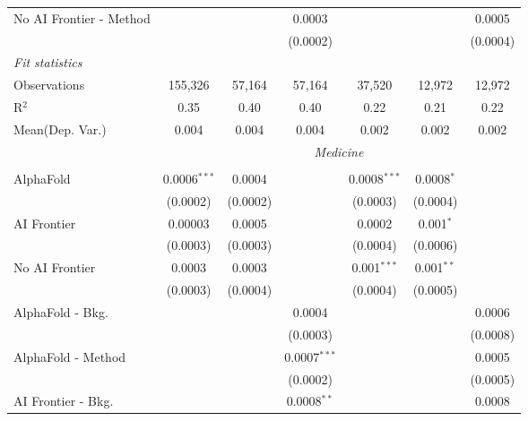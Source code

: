 \begin{tabular}{lcccccc}
   No AI Frontier - Method &                &               & 0.0003         &               &          & 0.0005\\   
                           &                &               & (0.0002)       &               &          & (0.0004)\\   
   \midrule
   \emph{Fit statistics}\\
   Observations            & 155,326        & 57,164        & 57,164         & 37,520        & 12,972   & 12,972\\  
   R$^2$                   & 0.35           & 0.40          & 0.40           & 0.22          & 0.21     & 0.22\\  
   
Mean(Dep. Var.) & 0.004 & 0.004 & 0.004 & 0.002 & 0.002 & 0.002 \\
 & \multicolumn{6}{c}{\textit{Medicine}} \\ \\
   AlphaFold               & 0.0006$^{***}$ & 0.0004   &                & 0.0008$^{***}$ & 0.0008$^{*}$ &   \\   
                           & (0.0002)       & (0.0002) &                & (0.0003)       & (0.0004)     &   \\   
   AI Frontier             & 0.00003        & 0.0005   &                & 0.0002         & 0.001$^{*}$  &   \\   
                           & (0.0003)       & (0.0003) &                & (0.0004)       & (0.0006)     &   \\   
   No AI Frontier          & 0.0003         & 0.0003   &                & 0.001$^{***}$  & 0.001$^{**}$ &   \\   
                           & (0.0003)       & (0.0004) &                & (0.0004)       & (0.0005)     &   \\   
   AlphaFold - Bkg.        &                &          & 0.0004         &                &              & 0.0006\\   
                           &                &          & (0.0003)       &                &              & (0.0008)\\   
   AlphaFold - Method      &                &          & 0.0007$^{***}$ &                &              & 0.0005\\   
                           &                &          & (0.0002)       &                &              & (0.0005)\\   
   AI Frontier - Bkg.      &                &          & 0.0008$^{**}$  &                &              & 0.0008\\   

\end{tabular}
